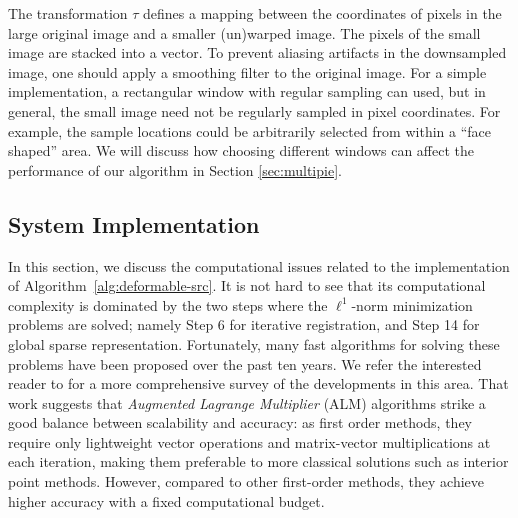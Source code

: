 \documentclass[10pt,journal,letterpaper,compsoc]{IEEEtran} %
\begin{document}
The transformation $\tau$ defines a mapping between the
coordinates of pixels in the large original image and a smaller
(un)warped image. The pixels of the small image are stacked into a vector. To prevent aliasing
artifacts in the downsampled image, one should apply a
smoothing filter to the original image. For a simple implementation, a rectangular window with
regular sampling can used, but in general, the small image need
not be regularly sampled in pixel coordinates.  For example,
the sample locations could be arbitrarily selected from within a
``face shaped'' area. We will discuss how choosing
different windows can affect the performance of our algorithm
in Section \ref{sec:multipie}.

\subsection{System Implementation}
In this section, we discuss the computational issues related to
the implementation of Algorithm~\ref{alg:deformable-src}. It is
not hard to see that its computational complexity is dominated
by the two steps where the $\ell^1$-norm minimization problems
are solved; namely Step 6 for iterative registration, and Step
14 for global sparse representation.
Fortunately, many fast algorithms for solving these problems have been proposed over the
past ten years. We refer the interested reader to \cite{YangA2010-pp} for a more comprehensive survey of the developments in this area.
That work suggests that \emph{Augmented Lagrange Multiplier}
(ALM) algorithms \cite{Bertsekas1982} strike a good balance
between scalability and accuracy: as first order methods, they
require only lightweight vector operations and matrix-vector
multiplications at each iteration, making them preferable to
more classical solutions such as interior point methods.
However, compared to other first-order methods, they achieve
higher accuracy with a fixed computational budget.
\end{document}
